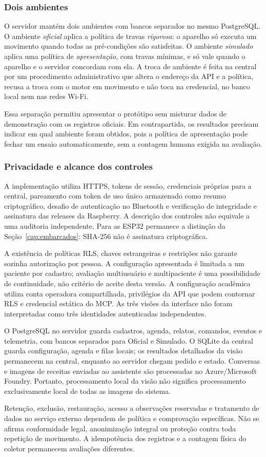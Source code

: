 \subsubsection{Dois ambientes}
O servidor mantém dois ambientes com bancos separados no mesmo PostgreSQL. O ambiente \emph{oficial} aplica a política de travas \emph{rigorosa}: o aparelho só executa um movimento quando todas as pré-condições são satisfeitas. O ambiente \emph{simulado} aplica uma política de \emph{apresentação}, com travas mínimas, e só vale quando o aparelho e o servidor concordam com ela. A troca de ambiente é feita na central por um procedimento administrativo que altera o endereço da API e a política, recusa a troca com o motor em movimento e não toca na credencial, no banco local nem nas redes Wi-Fi.

Essa separação permitiu apresentar o protótipo sem misturar dados de demonstração com os registros oficiais. Em contrapartida, os resultados precisam indicar em qual ambiente foram obtidos, pois a política de apresentação pode fechar um ensaio automaticamente, sem a contagem humana exigida na avaliação.

\subsubsection{Privacidade e alcance dos controles}
A implementação utiliza HTTPS, tokens de sessão, credenciais próprias para a central, pareamento com token de uso único armazenado como resumo criptográfico, desafio de autenticação no Bluetooth e verificação de integridade e assinatura das releases da Raspberry. A descrição dos controles não equivale a uma auditoria independente. Para as ESP32 permanece a distinção da Seção~\ref{cap:embarcados}: SHA-256 não é assinatura criptográfica. 

A existência de políticas RLS, chaves estrangeiras e restrições não garante sozinha autorização por pessoa. A configuração apresentada é limitada a um paciente por cadastro; avaliação multiusuário e multipaciente é uma possibilidade de continuidade, não critério de aceite desta versão. A configuração acadêmica utiliza conta operadora compartilhada, privilégios da API que podem contornar RLS e credencial estática do MCP. As três visões da interface não foram interpretadas como três identidades autenticadas independentes. 

O PostgreSQL no servidor guarda cadastros, agenda, relatos, comandos, eventos e telemetria, com bancos separados para Oficial e Simulado. O SQLite da central guarda configuração, agenda e filas locais; os resultados detalhados da visão permanecem na central, enquanto ao servidor chegam pedido e estado. Conversas e imagens de receitas enviadas ao assistente são processadas no Azure/Microsoft Foundry. Portanto, processamento local da visão não significa processamento exclusivamente local de todas as imagens do sistema. 

Retenção, exclusão, restauração, acesso a observações reservadas e tratamento de dados no serviço externo dependem de política e comprovação específicas. Não se afirma conformidade legal, anonimização integral ou proteção contra toda repetição de movimento. A idempotência dos registros e a contagem física do coletor permanecem avaliações diferentes.
